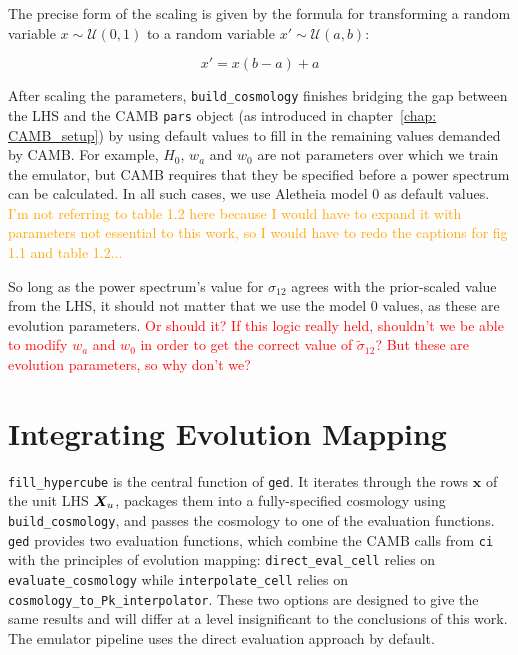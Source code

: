 The precise form of the scaling is given by the formula for transforming a
random variable $x \sim \mathcal{U}(0, 1)$ to a random variable
$x' \sim \mathcal{U}(a, b)$:

\begin{equation}
\label{eq: scaling}
x' = x (b - a) + a
\end{equation}

After scaling the parameters, \verb|build_cosmology| finishes bridging the gap
between the LHS and the CAMB \verb|pars| object (as introduced in
chapter~\ref{chap: CAMB_setup}) by using default values to fill in the
remaining values demanded by CAMB. For example, $H_0$, $w_a$ and $w_0$ are
not parameters over
which we train the emulator, but CAMB requires that they be specified before
a power spectrum can be calculated. In all such cases, we use Aletheia model
0 as default values. \textcolor{orange}{I'm not referring to table 1.2 here
because I would have to expand it with parameters not essential to this work,
so I would have to redo the captions for fig 1.1 and table 1.2...}

So long as the power spectrum's value for $\sigma_{12}$ agrees with the
prior-scaled value from the LHS, it should not matter that 
we use the model 0 values, as these are evolution parameters.
\textcolor{red}{Or should it? If this logic really held, shouldn't we be able 
to modify $w_a$ and $w_0$ in order to get the correct value of
$\tilde{\sigma}_{12}$? But these are evolution parameters, so why don't we?}

\section{Integrating Evolution Mapping}
\label{sec: generate_emu_data}



\verb|fill_hypercube| is the central function of \texttt{ged}. It iterates 
through the rows $\bm{x}$ of the unit LHS
$\bm{X}_u$, packages them into a fully-specified cosmology using
\verb|build_cosmology|, and passes the cosmology to one of the 
evaluation functions. \texttt{ged} provides two evaluation functions, which 
combine the CAMB calls from \texttt{ci} with the
principles of evolution mapping: \verb|direct_eval_cell| relies on
\verb|evaluate_cosmology| while \verb|interpolate_cell| relies on
\verb|cosmology_to_Pk_interpolator|. These two options are designed to give
the same results and will differ at a level insignificant to the conclusions
of this work. The emulator pipeline uses the direct evaluation approach by
default.

